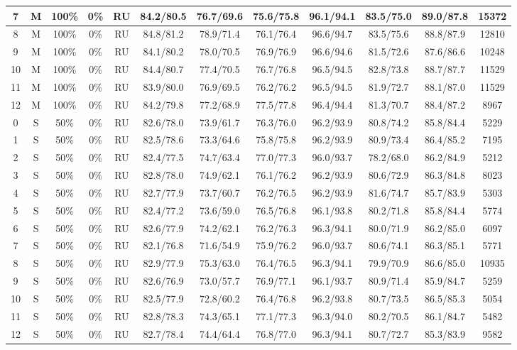 \begin{table*}
{\begin{tabular}{|c|c|c|c|c||c|c|c|c|c|c||c|}
7 & M & 100\% & 0\% & RU & 84.2/80.5 & 76.7/69.6 & 75.6/75.8 & 96.1/94.1 & 83.5/75.0 & 89.0/87.8 & 15372 \\ \hline
8 & M & 100\% & 0\% & RU & 84.8/81.2 & 78.9/71.4 & 76.1/76.4 & 96.6/94.7 & 83.5/75.6 & 88.8/87.9 & 12810 \\ \hline
9 & M & 100\% & 0\% & RU & 84.1/80.2 & 78.0/70.5 & 76.9/76.9 & 96.6/94.6 & 81.5/72.6 & 87.6/86.6 & 10248 \\ \hline
10 & M & 100\% & 0\% & RU & 84.4/80.7 & 77.4/70.5 & 76.7/76.8 & 96.5/94.5 & 82.8/73.8 & 88.7/87.7 & 11529 \\ \hline
11 & M & 100\% & 0\% & RU & 83.9/80.0 & 76.9/69.5 & 76.2/76.2 & 96.5/94.5 & 81.9/72.7 & 88.1/87.0 & 11529 \\ \hline
12 & M & 100\% & 0\% & RU & 84.2/79.8 & 77.2/68.9 & 77.5/77.8 & 96.4/94.4 & 81.3/70.7 & 88.4/87.2 & 8967 \\ \hline
0 & S & 50\% & 0\% & RU & 82.6/78.0 & 73.9/61.7 & 76.3/76.0 & 96.2/93.9 & 80.8/74.2 & 85.8/84.4 & 5229 \\ \hline
1 & S & 50\% & 0\% & RU & 82.5/78.6 & 73.3/64.6 & 75.8/75.8 & 96.2/93.9 & 80.9/73.4 & 86.4/85.2 & 7195 \\ \hline
2 & S & 50\% & 0\% & RU & 82.4/77.5 & 74.7/63.4 & 77.0/77.3 & 96.0/93.7 & 78.2/68.0 & 86.2/84.9 & 5212 \\ \hline
3 & S & 50\% & 0\% & RU & 82.8/78.0 & 74.9/62.1 & 76.1/76.2 & 96.2/93.9 & 80.6/72.9 & 86.3/84.8 & 8023 \\ \hline
4 & S & 50\% & 0\% & RU & 82.7/77.9 & 73.7/60.7 & 76.2/76.5 & 96.2/93.9 & 81.6/74.7 & 85.7/83.9 & 5303 \\ \hline
5 & S & 50\% & 0\% & RU & 82.4/77.2 & 73.6/59.0 & 76.5/76.8 & 96.1/93.8 & 80.2/71.8 & 85.8/84.4 & 5774 \\ \hline
6 & S & 50\% & 0\% & RU & 82.6/77.9 & 74.2/62.1 & 76.2/76.3 & 96.3/94.1 & 80.0/71.9 & 86.2/85.0 & 6097 \\ \hline
7 & S & 50\% & 0\% & RU & 82.1/76.8 & 71.6/54.9 & 75.9/76.2 & 96.0/93.7 & 80.6/74.1 & 86.3/85.1 & 5771 \\ \hline
8 & S & 50\% & 0\% & RU & 82.9/77.9 & 75.3/63.0 & 76.4/76.5 & 96.3/94.1 & 79.9/70.9 & 86.6/85.0 & 10935 \\ \hline
9 & S & 50\% & 0\% & RU & 82.6/76.9 & 73.0/57.7 & 76.9/77.1 & 96.1/93.7 & 80.9/71.4 & 85.9/84.7 & 5259 \\ \hline
10 & S & 50\% & 0\% & RU & 82.5/77.9 & 72.8/60.2 & 76.4/76.8 & 96.2/93.8 & 80.7/73.5 & 86.5/85.3 & 5054 \\ \hline
11 & S & 50\% & 0\% & RU & 82.8/78.3 & 74.3/65.1 & 77.1/77.3 & 96.3/94.0 & 80.2/70.5 & 86.1/84.7 & 5482 \\ \hline
12 & S & 50\% & 0\% & RU & 82.7/78.4 & 74.4/64.4 & 76.8/77.0 & 96.3/94.1 & 80.7/72.7 & 85.3/83.9 & 9582 \\ \hline
\end{tabular}}
\end{table*}

